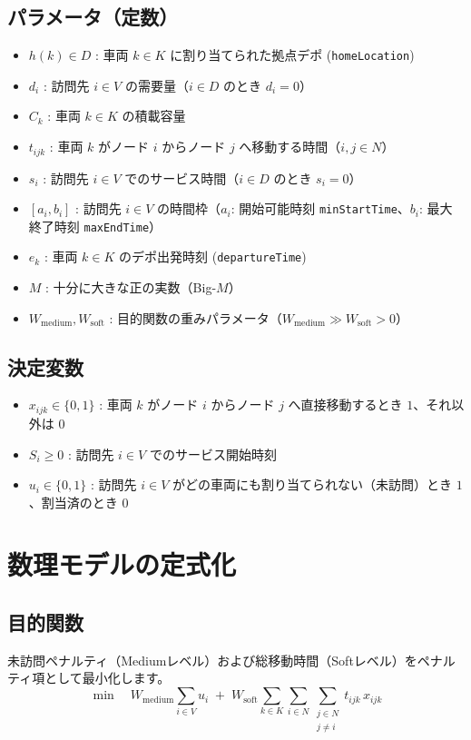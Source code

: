 \documentclass[11pt,a4paper]{article}
\begin{document}
\subsection{パラメータ（定数）}
\begin{itemize}
    \item $h(k) \in D$ : 車両 $k \in K$ に割り当てられた拠点デポ (\texttt{homeLocation})
    \item $d_i$ : 訪問先 $i \in V$ の需要量（$i \in D$ のとき $d_i = 0$）
    \item $C_k$ : 車両 $k \in K$ の積載容量
    \item $t_{ijk}$ : 車両 $k$ がノード $i$ からノード $j$ へ移動する時間（$i, j \in N$）
    \item $s_i$ : 訪問先 $i \in V$ でのサービス時間（$i \in D$ のとき $s_i = 0$）
    \item $[a_i, b_i]$ : 訪問先 $i \in V$ の時間枠（$a_i$: 開始可能時刻 \texttt{minStartTime}、$b_i$: 最大終了時刻 \texttt{maxEndTime}）
    \item $e_k$ : 車両 $k \in K$ のデポ出発時刻 (\texttt{departureTime})
    \item $M$ : 十分に大きな正の実数（Big-$M$）
    \item $W_{\text{medium}}, W_{\text{soft}}$ : 目的関数の重みパラメータ（$W_{\text{medium}} \gg W_{\text{soft}} > 0$）
\end{itemize}

\subsection{決定変数}
\begin{itemize}
    \item $x_{ijk} \in \{0, 1\}$ : 車両 $k$ がノード $i$ からノード $j$ へ直接移動するとき $1$、それ以外は $0$
    \item $S_i \ge 0$ : 訪問先 $i \in V$ でのサービス開始時刻
    \item $u_i \in \{0, 1\}$ : 訪問先 $i \in V$ がどの車両にも割り当てられない（未訪問）とき $1$、割当済のとき $0$
\end{itemize}

\section{数理モデルの定式化}

\subsection{目的関数}
未訪問ペナルティ（Mediumレベル）および総移動時間（Softレベル）をペナルティ項として最小化します。
\begin{equation}
\min \quad W_{\text{medium}} \sum_{i \in V} u_i \;+\; W_{\text{soft}} \sum_{k \in K} \sum_{i \in N} \sum_{\substack{j \in N \\ j \neq i}} t_{ijk} \, x_{ijk}
\end{equation}
\end{document}
